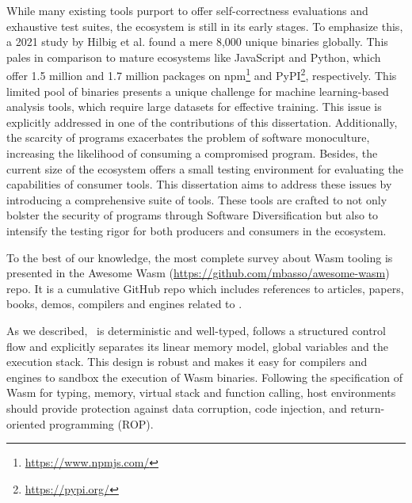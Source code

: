 While many existing tools purport to offer self-correctness evaluations and exhaustive test suites, the \Wasm ecosystem is still in its early stages. 
To emphasize this, a 2021 study by Hilbig et al.\cite{Hilbig2021AnES} found a mere 8,000 unique \Wasm binaries globally. 
This pales in comparison to mature ecosystems like JavaScript and Python, which offer 1.5 million and 1.7 million packages on npm\footnote{\url{https://www.npmjs.com/}} and PyPI\footnote{\url{https://pypi.org/}}, respectively.
This limited pool of \Wasm binaries presents a unique challenge for machine learning-based analysis tools, which require large datasets for effective training. 
This issue is explicitly addressed in one of the contributions of this dissertation\cite{EVASION}.
Additionally, the scarcity of \Wasm programs exacerbates the problem of software monoculture, increasing the likelihood of consuming a compromised \Wasm program\cite{YourCitationHere}.
Besides, the current size of the \Wasm ecosystem offers a small testing environment for evaluating the capabilities of consumer tools.
This dissertation aims to address these issues by introducing a comprehensive suite of tools. 
These tools are crafted to not only bolster the security of \Wasm programs through Software Diversification but also to intensify the testing rigor for both producers and consumers in the ecosystem.


To the best of our knowledge, the most complete survey about Wasm  tooling is presented in the Awesome Wasm  (\url{https://github.com/mbasso/awesome-wasm}) repo. It is a cumulative GitHub repo which includes references to articles, papers, books, demos, compilers and engines related to \wasm. 




As we described, \wasm\ is deterministic and well-typed, follows a structured control flow and explicitly separates its linear memory model, global variables and the execution stack. This design is robust \cite{WebAssemblySecurity} and makes it easy for compilers and engines to sandbox the execution of Wasm  binaries. Following the specification of Wasm  for typing, memory, virtual stack and function calling,
host environments should provide protection against data corruption, code injection, and return-oriented programming (ROP).

